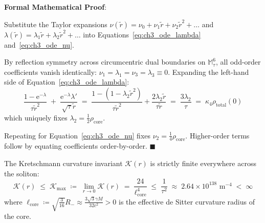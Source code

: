 \documentclass[
    12pt,
    a4paper,
    headings=normal,
    twoside=false,
    open=any,
    parskip=half
]{scrbook}
\newcommand{\eu}{\mathrm{e}}
\newenvironment{myproof}[1][]{%
  \par\vspace{6pt}\noindent\textbf{\sffamily\color{maincolor}Formal Mathematical Proof\ifstrempty{#1}{}{ (#1)}}:\par\nopagebreak
}{%
  \penalty50\hfill\ensuremath{\blacksquare}\par\vspace{6pt}
}
\begin{document}
\begin{myproof}
Substitute the Taylor expansions $\nu(\tilde{r}) = \nu_0 + \nu_1 \tilde{r} + \nu_2 \tilde{r}^2 + \dots$ and $\lambda(\tilde{r}) = \lambda_1 \tilde{r} + \lambda_2 \tilde{r}^2 + \dots$ into Equations~\eqref{eq:ch3_ode_lambda} and~\eqref{eq:ch3_ode_nu}. 

By reflection symmetry across circumcentric dual boundaries on $\mathbb{M}_\tau^6$, all odd-order coefficients vanish identically: $\nu_1 = \lambda_1 = \nu_3 = \lambda_3 \equiv 0$.
Expanding the left-hand side of Equation~\eqref{eq:ch3_ode_lambda}:
\begin{equation*}
\frac{1 - \eu^{-\lambda}}{\tau \tilde{r}^2} \;+\; \frac{\eu^{-\lambda} \lambda'}{\sqrt{\tau} \tilde{r}} \;=\; \frac{1 - (1 - \lambda_2 \tilde{r}^2)}{\tau \tilde{r}^2} + \frac{2\lambda_2 \tilde{r}}{\tau \tilde{r}} \;=\; \frac{3\lambda_2}{\tau} \;=\; \kappa_4 \rho_{\text{total}}(0)
\end{equation*}
which uniquely fixes $\lambda_2 = \frac{1}{2} \rho_{\text{core}}$. 

Repeating for Equation~\eqref{eq:ch3_ode_nu} fixes $\nu_2 = \frac{1}{4} \rho_{\text{core}}$. Higher-order terms follow by equating coefficients order-by-order.
\end{myproof}

\begin{phystheorem}\label{thm:ch3_curvature_regularity}
The Kretschmann curvature invariant $\mathcal{K}(r)$ is strictly finite everywhere across the soliton:
\begin{equation}
\boxed{\mathcal{K}(r) \;\le\; \mathcal{K}_{\max} \;\coloneqq\; \lim_{r \to 0} \mathcal{K}(r) \;=\; \frac{24}{\ell_{\text{core}}^4} \;\le\; \frac{1}{\tau^2} \;\approx\; 2.64 \times 10^{138} \text{ m}^{-4} \;<\; \infty}
\label{eq:ch3_kretschmann_regularity_bound}
\end{equation}
where $\ell_{\text{core}} \coloneqq \sqrt{\frac{3}{16}} R_- \approx \frac{3\sqrt{3}\gamma M}{32 c^2} > 0$ is the effective de Sitter curvature radius of the core.
\end{phystheorem}
\end{document}
